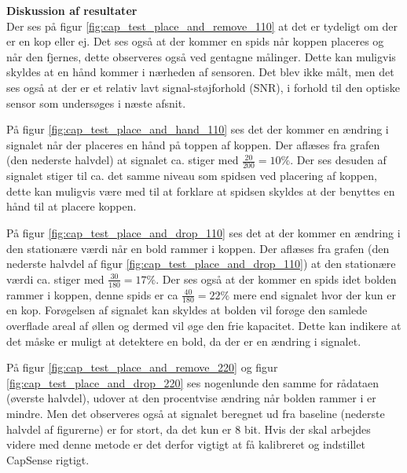 \documentclass[HardwareDesign/HardwareDesign_main.tex]{subfiles}
\begin{document}
\textbf{Diskussion af resultater}\\
Der ses på figur \ref{fig:cap_test_place_and_remove_110} at det er tydeligt om der er en kop eller ej. Det ses også at der kommer en spids når koppen placeres og når den fjernes, dette observeres også ved gentagne målinger. Dette kan muligvis skyldes at en hånd kommer i nærheden af sensoren. Det blev ikke målt, men det ses også at der er et relativ lavt signal-støjforhold (SNR), i forhold til den optiske sensor som undersøges i næste afsnit.

På figur \ref{fig:cap_test_place_and_hand_110} ses det der kommer en ændring i signalet når der placeres en hånd på toppen af koppen. Der aflæses fra grafen (den nederste halvdel) at signalet ca. stiger med $\frac{20}{200} = 10\%$. Der ses desuden af signalet stiger til ca. det samme niveau som spidsen ved placering af koppen, dette kan muligvis være med til at forklare at spidsen skyldes at der benyttes en hånd til at placere koppen.

På figur \ref{fig:cap_test_place_and_drop_110} ses det at der kommer en ændring i den stationære værdi når en bold rammer i koppen. Der aflæses fra grafen (den nederste halvdel af figur \ref{fig:cap_test_place_and_drop_110}) at den stationære værdi ca. stiger med $\frac{30}{180} = 17\%$. Der ses også at der kommer en spids idet bolden rammer i koppen, denne spids er ca $\frac{40}{180} = 22\%$ mere end signalet hvor der kun er en kop. Forøgelsen af signalet kan skyldes at bolden vil forøge den samlede overflade areal af øllen og dermed vil øge den frie kapacitet. Dette kan indikere at det måske er muligt at detektere en bold, da der er en ændring i signalet.

På figur \ref{fig:cap_test_place_and_remove_220} og figur \ref{fig:cap_test_place_and_drop_220} ses nogenlunde den samme for rådataen (øverste halvdel), udover at den procentvise ændring når bolden rammer i er mindre. Men det observeres også at signalet beregnet ud fra baseline (nederste halvdel af figurerne) er for stort, da det kun er 8 bit. Hvis der skal arbejdes videre med denne metode er det derfor vigtigt at få kalibreret og indstillet CapSense rigtigt.
\end{document}
